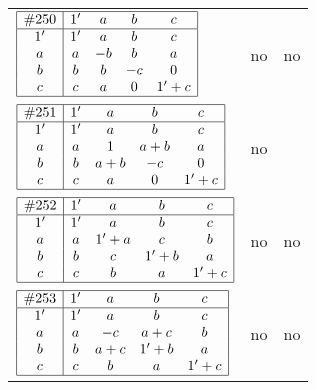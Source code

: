 \documentclass[12pt]{article}
\newcommand{\join}{\mathbin{+}}%
\newcommand{\id}{{1'}}%
\renewcommand{\top}{1}%
\begin{document}
\begin{center}
\begin{longtable}{l|c|c}
$
\begin{array}{|c|cccc|} \hline
\#250 & \id & a & b & c \\ \hline
\id & \id & a & b & c \\
a & a & -b & b & a \\
b & b & b & -c & 0 \\
c & c & a & 0 & \id \join c \\ \hline
\end{array}
$
 & no  
 & no      \\[15mm]

$
\begin{array}{|c|cccc|} \hline
\#251 & \id & a & b & c \\ \hline
\id & \id & a & b & c \\
a & a & \top & a \join b & a \\
b & b & a \join b & -c & 0 \\
c & c & a & 0 & \id \join c \\ \hline
\end{array}
$
 & no  
 & \adjustbox{valign=c, max height=1.6cm}{$
\left[ \begin{array}{ccccccc}
\id & a & a & b & a & b & a \\ 
a & \id & a & a & c & a & c \\ 
a & a & \id & b & a & b & a \\ 
b & a & b & \id & a & b & a \\ 
a & c & a & a & \id & a & c \\ 
b & a & b & b & a & \id & a \\ 
a & c & a & a & c & a & \id
\end{array}\right]
$}      \\[15mm]

$
\begin{array}{|c|cccc|} \hline
\#252 & \id & a & b & c \\ \hline
\id & \id & a & b & c \\
a & a & \id \join a & c & b \\
b & b & c & \id \join b & a \\
c & c & b & a & \id \join c \\ \hline
\end{array}
$
 & no  
 & no      \\[15mm]

$
\begin{array}{|c|cccc|} \hline
\#253 & \id & a & b & c \\ \hline
\id & \id & a & b & c \\
a & a & -c & a \join c & b \\
b & b & a \join c & \id \join b & a \\
c & c & b & a & \id \join c \\ \hline
\end{array}
$
 & no  
 & no      \\[15mm]


\end{longtable}
\end{center}
\end{document}
